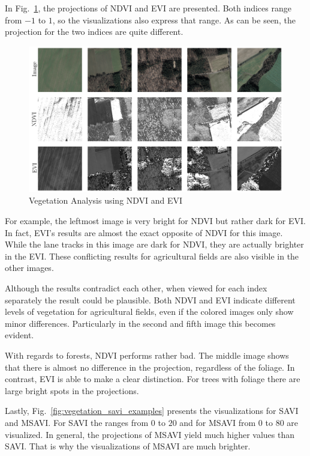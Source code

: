 In Fig.~\ref{fig:vegetation_ndvi_examples}, the projections of NDVI and EVI are presented. Both indices range from $-1$ to $1$, so the visualizations also express that range. As can be seen, the projection for the two indices are quite different.

\begin{figure}[h]
    \centering
    \includegraphics[width=\textwidth]{images/vegetation/ndvi_evi}
    \caption{Vegetation Analysis using NDVI and EVI}
    \label{fig:vegetation_ndvi_examples}
\end{figure}

For example, the leftmost image is very bright for NDVI but rather dark for EVI. In fact, EVI's results are almost the exact opposite of NDVI for this image. While the lane tracks in this image are dark for NDVI, they are actually brighter in the EVI. These conflicting results for agricultural fields are also visible in the other images. 

Although the results contradict each other, when viewed for each index separately the result could be plausible. Both NDVI and EVI indicate different levels of vegetation for agricultural fields, even if the colored images only show minor differences. Particularly in the second and fifth image this becomes evident.

With regards to forests, NDVI performs rather bad. The middle image shows that there is almost no difference in the projection, regardless of the foliage. In contrast, EVI is able to make a clear distinction. For trees with foliage there are large bright spots in the projections.

Lastly, Fig.~\ref{fig:vegetation_savi_examples} presents the visualizations for SAVI and MSAVI. For SAVI the ranges from $0$ to $20$ and for MSAVI from $0$ to $80$ are visualized. In general, the projections of MSAVI yield much higher values than SAVI. That is why the visualizations of MSAVI are much brighter.

